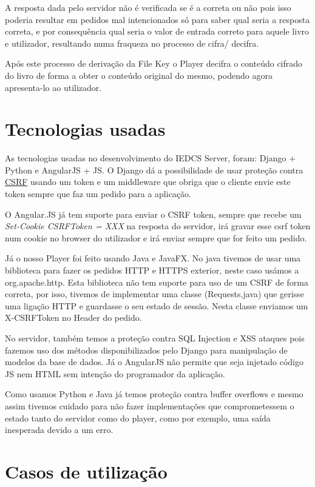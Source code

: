 \documentclass[pdftex,12pt,a4paper]{report}
\begin{document}
A resposta dada pelo servidor não é verificada se é a correta ou não pois isso poderia resultar em pedidos mal intencionados só para saber qual seria a resposta correta, e por consequência qual seria o valor de entrada correto para aquele livro e utilizador, resultando numa fraqueza no processo de cifra/ decifra.

Após este processo de derivação da File Key o Player decifra o conteúdo cifrado do livro de forma a obter o conteúdo original do mesmo, podendo agora apresenta-lo ao utilizador.

\section{Tecnologias usadas}

As tecnologias usadas no desenvolvimento do IEDCS Server, foram: Django + Python e AngularJS + JS. O Django dá a possibilidade de usar proteção contra \href{https://docs.djangoproject.com/en/1.8/ref/csrf/}{CSRF} usando um token e um middleware que obriga que o cliente envie este token sempre que faz um pedido para a aplicação.  

O Angular.JS já tem suporte para enviar o CSRF token, sempre que recebe um \textit{Set-Cookie CSRFToken = XXX} na resposta do servidor, irá gravar esse csrf token num cookie no browser do utilizador e irá enviar sempre que for feito um pedido.

Já o nosso Player foi feito usando Java e JavaFX. No java tivemos de usar uma biblioteca para fazer os pedidos HTTP e HTTPS exterior, neste caso usámos a org.apache.http. Esta biblioteca não tem suporte para uso de um CSRF de forma correta, por isso, tivemos de implementar uma classe (Requests.java) que gerisse uma ligação HTTP e guardasse o seu estado de sessão. Nesta classe enviamos um X-CSRFToken no Header do pedido.

No servidor, também temos a proteção contra SQL Injection e XSS ataques pois fazemos uso dos métodos disponibilizados pelo Django para manipulação de modelos da base de dados. Já o AngularJS não permite que seja injetado código JS nem HTML sem intenção do programador da aplicação.

Como usamos Python e Java já temos proteção contra buffer overflows e mesmo assim tivemos cuidado para não fazer implementações que comprometessem o estado tanto do servidor como do player, como por exemplo, uma saída inesperada devido a um erro.

\section{Casos de utilização}
\end{document}
